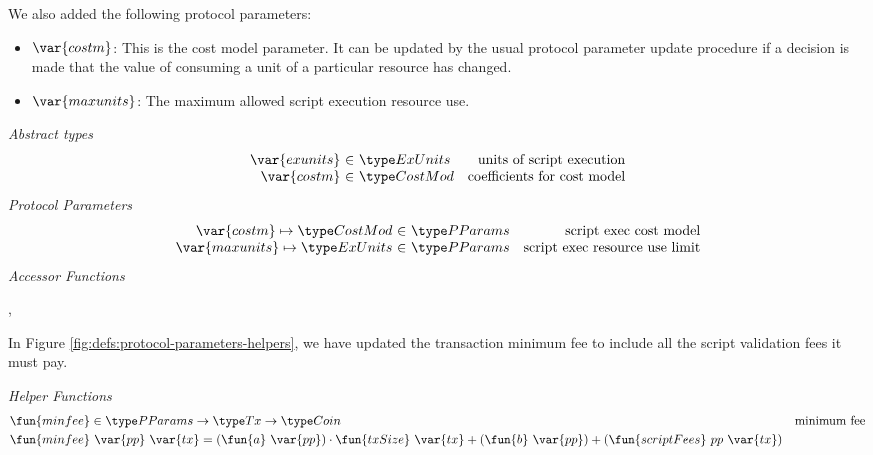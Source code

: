 We also added the following protocol parameters:

\begin{itemize}
  \item $\var{costm}$: This is the cost model parameter. It can be updated by
  the usual protocol parameter update procedure if a decision is made that
  the value of consuming a unit of a particular resource has changed.

  \item $\var{maxunits}$: The maximum allowed script execution resource use.
\end{itemize}


\begin{figure*}[htb]
  \emph{Abstract types}
  \begin{equation*}
    \begin{array}{r@{~\in~}lr}
      \var{exunits} & \ExUnits & \text{units of script execution} \\
      \var{costm} & \CostMod & \text{coefficients for cost model} \\
    \end{array}
  \end{equation*}
  \emph{Protocol Parameters}
  \begin{equation*}
      \begin{array}{r@{~\in~}lr}
        \var{costm} \mapsto \CostMod & \PParams & \text{script exec cost model}\\
        \var{maxunits} \mapsto \ExUnits & \PParams & \text{script exec resource use limit}\\
      \end{array}
  \end{equation*}
  \emph{Accessor Functions}
  \begin{center}
    ,
  \end{center}
  \caption{Definitions Used in Protocol Parameters}
  \label{fig:defs:protocol-parameters}
\end{figure*}

In Figure \ref{fig:defs:protocol-parameters-helpers}, we have updated the
transaction minimum fee to include all the script validation fees it must pay. 

\begin{figure*}[htb]
  \emph{Helper Functions}
  \begin{align*}
    \fun{minfee} & \in \PParams \to \Tx \to \Coin & \text{minimum fee}\\
    \fun{minfee} & ~\var{pp}~\var{tx} =
    (\fun{a}~\var{pp}) \cdot \fun{txSize}~\var{tx} + (\fun{b}~\var{pp})
    + (\fun{scriptFees}~{pp}~\var{tx})
  \end{align*}
  \caption{Helper functions for the Protocol Parameters}
  \label{fig:defs:protocol-parameters-helpers}
\end{figure*}

\clearpage
